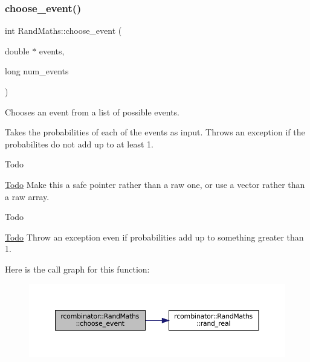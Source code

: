 \subsubsection{\texorpdfstring{choose\+\_\+event()}{choose\_event()}}
{\footnotesize\ttfamily int Rand\+Maths\+::choose\+\_\+event (\begin{DoxyParamCaption}\item[{double $\ast$}]{events,  }\item[{long}]{num\+\_\+events }\end{DoxyParamCaption})}



Chooses an event from a list of possible events. 

Takes the probabilities of each of the events as input. Throws an exception if the probabilites do not add up to at least 1.

\begin{DoxyRefDesc}{Todo}
\item[\mbox{\hyperlink{todo__todo000001}{Todo}}]Make this a safe pointer rather than a raw one, or use a vector rather than a raw array.\end{DoxyRefDesc}


\begin{DoxyRefDesc}{Todo}
\item[\mbox{\hyperlink{todo__todo000002}{Todo}}]Throw an exception even if probabilities add up to something greater than 1. \end{DoxyRefDesc}
Here is the call graph for this function\+:
\nopagebreak
\begin{figure}[H]
\begin{center}
\leavevmode
\includegraphics[width=350pt]{classrcombinator_1_1RandMaths_afbc0d35bd9744ecab1983914ac32d68c_cgraph}
\end{center}
\end{figure}
\mbox{\label{classrcombinator_1_1RandMaths_aa96396651fba75ffb972b5fa1c2994c7}} 

